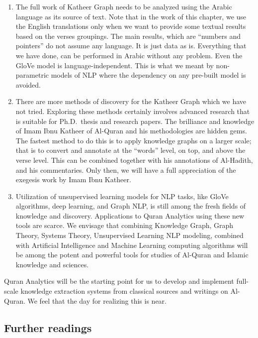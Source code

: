 \documentclass[
]{article}
\begin{document}
\begin{enumerate}
\def\labelenumi{\arabic{enumi}.}
\item
  The full work of Katheer Graph needs to be analyzed using the Arabic language as its source of text. Note that in the work of this chapter, we use the English translations only when we want to provide some textual results based on the verses groupings. The main results, which are ``numbers and pointers'' do not assume any language. It is just data as is. Everything that we have done, can be performed in Arabic without any problem. Even the GloVe model is language-independent. This is what we meant by non-parametric models of NLP where the dependency on any pre-built model is avoided.
\item
  There are more methods of discovery for the Katheer Graph which we have not tried. Exploring these methods certainly involves advanced research that is suitable for Ph.D.~thesis and research papers. The brilliance and knowledge of Imam Ibnu Katheer of Al-Quran and his methodologies are hidden gems. The fastest method to do this is to apply knowledge graphs on a larger scale; that is to convert and annotate at the ``words'' level, on top, and above the verse level. This can be combined together with his annotations of Al-Hadith, and his commentaries. Only then, we will have a full appreciation of the exegesis work by Imam Ibnu Katheer.
\item
  Utilization of unsupervised learning models for NLP tasks, like GloVe algorithms, deep learning, and Graph NLP, is still among the fresh fields of knowledge and discovery. Applications to Quran Analytics using these new tools are scarce. We envisage that combining Knowledge Graph, Graph Theory, Systems Theory, Unsupervised Learning NLP modeling, combined with Artificial Intelligence and Machine Learning computing algorithms will be among the potent and powerful tools for studies of Al-Quran and Islamic knowledge and sciences.
\end{enumerate}

Quran Analytics will be the starting point for us to develop and implement full-scale knowledge extraction systems from classical sources and writings on Al-Quran. We feel that the day for realizing this is near.

\hypertarget{further-readings-8}{%
\subsection{Further readings}\label{further-readings-8}}
\end{document}
